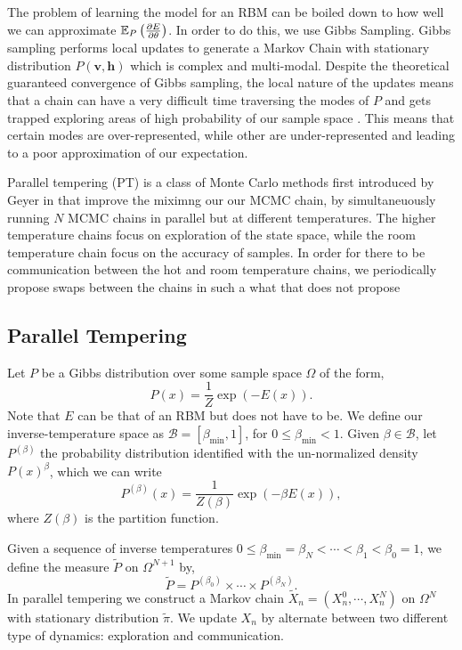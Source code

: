 The problem of learning the model for an RBM can be boiled down to how well we can approximate ${\mathbb{E}}_P\left(\frac{\partial E}{\partial \theta}\right)$. In order to do this, we use Gibbs Sampling. 
Gibbs sampling performs local updates to generate a Markov Chain with stationary distribution $P(\textbf{v},\textbf{h})$ which is complex and multi-modal. Despite the theoretical guaranteed convergence of Gibbs sampling, the local nature of the updates means that a chain can have a very difficult time traversing the modes of $P$ and   gets trapped exploring areas of high probability of our sample space . This means that certain modes are over-represented, while other are under-represented and leading to a poor approximation of our expectation.

Parallel tempering (PT) is a class of Monte Carlo methods first introduced by Geyer in \cite{geyer1991markov} that improve the miximng our our MCMC chain, by simultaneuously running $N$ MCMC chains in parallel but at different temperatures. The higher temperature chains focus on exploration of the state space, while the room temperature chain focus on the accuracy of samples. In order for there to be communication between the hot and room temperature chains, we periodically propose swaps between the chains in such a what that does not propose 


\subsection{Parallel Tempering}\label{sec_PT}
Let $P$ be a Gibbs distribution over some sample space $\Omega$ of the form,
\[P(x)=\frac{1}{Z} \exp(-E(x)).\]
Note that $E$ can be that of an RBM but does not have to be. We define our inverse-temperature space as $\mathcal{B}=[\beta_{\min},1]$, for $0\leq \beta_{\min}<1$. Given $\beta\in\mathcal{B}$, let $P^{(\beta)}$ the probability distribution identified with the un-normalized density $P(x)^\beta$, which we can write
\[P^{(\beta)}(x)= \frac{1}{Z(\beta)} \exp(-\beta E(x)),\]
where $Z(\beta)$ is the partition function. 

Given a sequence of inverse temperatures $0\leq\beta_{\min}= \beta_N<\cdots<\beta_{1}<\beta_0=1$, we define the measure $\tilde{P}$ on $\Omega^{N+1}$ by,
\[\tilde{P}=P^{(\beta_0)}\times\cdots\times P^{(\beta_N)}.\]
In parallel tempering we construct a Markov chain $\tilde{X}_n=(X_n^{0},\cdots, X^{N}_n)$ on $\Omega^N$ with stationary distribution $\tilde{\pi}$. We update $X_n$ by alternate between two different type of dynamics: exploration and communication. 

